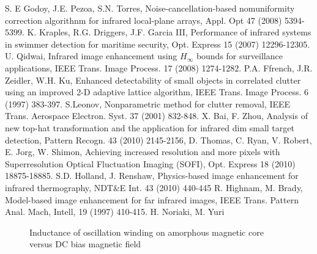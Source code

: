 \documentclass[a4paper, 11 pt, conference]{ieeeconf}      %
\begin{document}
\begin{thebibliography}{99}

 S. E Godoy, J.E. Pezoa, S.N. Torres, Noise-cancellation-based nomuniformity correction algorithnm for infrared local-plane arrays, Appl. Opt 47 (2008) 5394-5399.
 K. Kraples, R.G. Driggers, J.F. Garcia III, Performance of infrared systems in swimmer detection for maritime security, Opt. Express 15 (2007) 12296-12305.
 U. Qidwai, Infrared image enhancement using $H_\infty$ bounds for surveillance applications, IEEE Trans. Image Process. 17 (2008) 1274-1282.
 P.A. Ffrench, J.R. Zeidler, W.H. Ku, Enhanced detectability of small objects in correlated clutter using an improved 2-D adaptive lattice algorithm, IEEE Trans. Image Process. 6 (1997) 383-397.
 S.Leonov, Nonparametric method for clutter removal, IEEE Trans. Aerospace Electron. Syst. 37 (2001) 832-848.
 X. Bai, F. Zhou, Analysis of new top-hat transformation and the application for infrared dim small target detection, Pattern Recogn. 43 (2010) 2145-2156,
 D. Thomas, C. Ryan, V. Robert, E. Jorg, W. Shimon, Achieving increased resolution and more pixels with Superresolution Optical Fluctuation Imaging (SOFI), Opt. Express 18 (2010) 18875-18885.
 S.D. Holland, J. Renshaw, Physics-based image enhancement for infrared thermography, NDT&E Int. 43 (2010) 440-445
 R. Highnam, M. Brady, Model-based image enhancement for far infrared images, IEEE Trans. Pattern Anal. Mach, Intell,  19 (1997) 410-415.
 H. Noriaki, M. Yuri

\end{thebibliography}

   \begin{figure}[thpb]
      \centering
      \caption{Inductance of oscillation winding on amorphous
       magnetic core versus DC bias magnetic field}
      \label{figurelabel}
   \end{figure}
   


\addtolength{\textheight}{-12cm}   %







\end{document}
